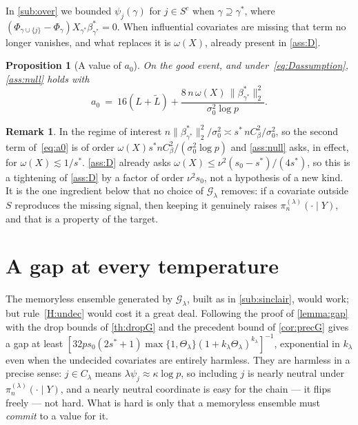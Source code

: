 \documentclass[aos]{imsart}
\newcommand{\Ltil}{\widetilde{L}}
\newcommand{\signal}{X_{\gamma^{\ast}}\beta^{\ast}_{\gamma^{\ast}}}
\theoremstyle{plain}
\newtheorem{proposition}{Proposition}[section]
\theoremstyle{definition}
\newtheorem{remark}{Remark}[section]
\begin{document}
    In \cref{sub:over} we bounded $\psi_j(\gamma)$ for $j\in S^{c}$ when
    $\gamma\supseteq\gamma^{\ast}$, where
    $(\Phi_{\gamma\cup\{j\}}-\Phi_\gamma)\signal=0$. When influential
    covariates are missing that term no longer vanishes, and what replaces it
    is $\omega(X)$, already present in \cref{ass:D}.

    \begin{proposition}[A value of $a_0$]
        \label{prop:a0}
        On the good event, and under~\eqref{eq:Dassumption},
        \cref{ass:null} holds with
        \begin{equation}
            \label{eq:a0}
            a_0\ =\ 16(L+\Ltil)
            +\frac{8\,n\,\omega(X)\,
            \|\beta^{\ast}_{\gamma^{\ast}}\|_2^{2}}
            {\sigma_0^{2}\log p} .
        \end{equation}
    \end{proposition}

    \begin{remark}
        \label{rem:a0cost}
        In the regime of interest $n\|\beta^{\ast}_{\gamma^{\ast}}\|_2^{2}
        /\sigma_0^{2}\asymp s^{\ast}\,nC_\beta^{2}/\sigma_0^{2}$, so the
        second term of~\eqref{eq:a0} is of order
        $\omega(X)s^{\ast}nC_\beta^{2}/(\sigma_0^{2}\log p)$ and
        \cref{ass:null} asks, in effect, for
        $\omega(X)\lesssim1/s^{\ast}$. \cref{ass:D} already asks
        $\omega(X)\leq\nu^{2}(s_0-s^{\ast})/(4s^{\ast})$, so this is a
        tightening of \cref{ass:D} by a factor of order $\nu^{2}s_0$, not a
        hypothesis of a new kind. It is the one ingredient below that no
        choice of $\mathcal{G}_\lambda$ removes: if a covariate outside $S$
        reproduces the missing signal, then keeping it genuinely raises
        $\pi_n^{(\lambda)}(\cdot\mid Y)$, and that is a property of the
        target.
    \end{remark}




    \section{A gap at every temperature}
    \label{sec:flow}

    The memoryless ensemble generated by $\mathcal{G}_\lambda$, built as in
    \cref{sub:sinclair}, would work; but rule~\ref{H:undec} would cost it a
    great deal. Following the proof of \cref{lemma:gap} with the drop
    bounds of \cref{th:dropG} and the precedent bound of \cref{cor:precG}
    gives a gap at least
    $[32ps_0(2s^{\ast}+1)\max\{1,\Theta_\lambda\}
    (1+k_\lambda\Theta_\lambda)^{k_\lambda}]^{-1}$, exponential in
    $k_\lambda$ even when the undecided covariates are entirely harmless.
    They are harmless in a precise sense: $j\in C_\lambda$ means
    $\lambda\psi_j\approx\kappa\log p$, so including $j$ is nearly neutral
    under $\pi_n^{(\lambda)}(\cdot\mid Y)$, and a nearly neutral coordinate is
    easy for the chain --- it flips freely --- not hard. What is hard is only
    that a memoryless ensemble must \emph{commit} to a value for it.
\end{document}
